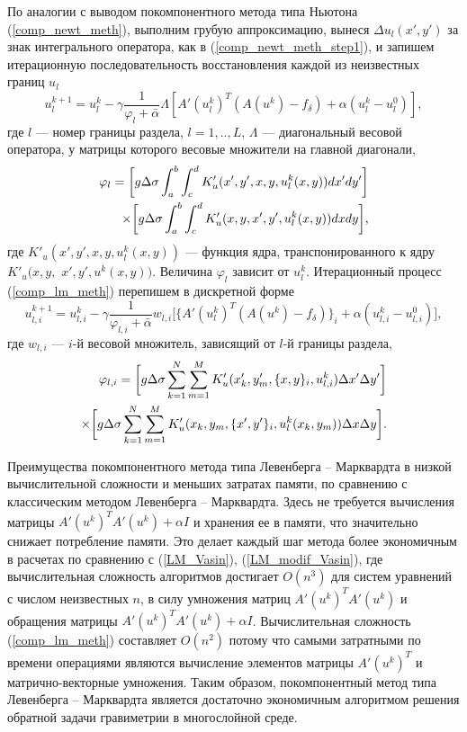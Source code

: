 По аналогии с выводом покомпонентного метода типа Ньютона (\ref{comp_newt_meth}), выполним грубую аппроксимацию, вынеся $\Delta u_l(x',y')$ за знак интегрального оператора, как в (\ref{comp_newt_meth_step1}), и запишем итерационную последовательность восстановления каждой из неизвестных границ $u_l$
\begin{equation}\label{comp_lm_meth}
u_l^{k+1}=u_l^k-\gamma\frac{1}{\varphi_l+\bar{\alpha}}\Lambda[ A'(u_l^k)^T(A(u^k)-f_\delta)+\alpha (u_l^k-u_l^0)],
\end{equation}
где $l$ --- номер границы раздела, $l=1,..,L$, $\Lambda$ --- диагональный весовой оператора, у матрицы которого весовые множители  на главной диагонали, 
\begin{equation*}
\begin{aligned}
\varphi_l=\bigg[ g\Delta\sigma\int_{a}^{b}\int_{c}^{d}
K'_u(x',y', x, y, u_l^k(x,y))dx'dy'\bigg] \notag \\ \times\bigg[g\Delta\sigma\int_{a}^{b}\int_{c}^{d}K'_u(x,y, x',y',u_l^k(x,y))dxdy\bigg], 
\end{aligned}
\end{equation*} 
где $K'_u(x',y', x, y, u_l^k(x,y))$ --- функция ядра, транспонированного к ядру $K'_u(x,y,$ $ x',y',u^k(x,y))$. Величина $\varphi_l$ зависит от $u_l^k$.
Итерационный процесс (\ref{comp_lm_meth}) перепишем в дискретной форме
\begin{equation}\label{comp_lm_meth_disc}
u_{l,i}^{k+1}=u_{l,i}^k-\gamma\frac{1}{\varphi_{l,i}+\bar{\alpha}}w_{l,i}\bigg[ \{A'(u_l^k)^T(A(u^k)-f_\delta)\}_i+\alpha (u_{l,i}^k-u_{l,i}^0)\bigg],
\end{equation}
где $w_{l,i}$ --- $i$-й весовой множитель, зависящий от $l$-й границы раздела,
\begin{equation*}
\begin{aligned}
\varphi_{l,i}=\bigg[ g\Delta\sigma\sum\limits_{k=1}^{N}
\sum\limits_{m=1}^{M}
K'_u(x'_k,y'_m, \{x, y\}_i, u_{l,i}^k) \Delta x' \Delta y'\bigg] \notag \\ \times\bigg[g\Delta\sigma\sum\limits_{k=1}^{N}
\sum\limits_{m=1}^{M}K'_u(x_k,y_m, \{x',y'\}_i,u_l^k(x_k,y_m))\Delta x \Delta y\bigg]. 
\end{aligned}
\end{equation*}

Преимущества покомпонентного метода типа Левенберга -- Марквардта в низкой вычислительной сложности и меньших затратах памяти, по сравнению с классическим методом Левенберга -- Марквардта. Здесь не требуется вычисления матрицы $A'(u^k)^T A'(u^k)+\alpha I$ и хранения ее в памяти, что значительно снижает потребление памяти. Это делает каждый шаг метода более экономичным в расчетах по сравнению с (\ref{LM_Vasin}), (\ref{LM_modif_Vasin}), где вычислительная сложность алгоритмов достигает $O(n^3)$ для систем уравнений с числом неизвестных $n$, в силу умножения матриц $A'(u^k)^T A'(u^k)$ и обращения матрицы $A'(u^k)^T A'(u^k)+\alpha I$. Вычислительная сложность (\ref{comp_lm_meth}) составляет $O(n^2)$ потому что самыми затратными по времени операциями являются вычисление элементов матрицы $A'(u^k)^T$ и матрично-векторные умножения. Таким образом, покомпонентный метод типа Левенберга -- Марквардта является достаточно экономичным алгоритмом решения обратной задачи гравиметрии в многослойной среде.

